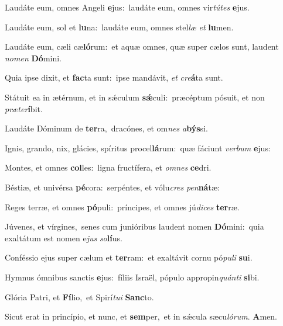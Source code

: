 Laudáte eum, omnes Angeli \textbf{e}jus:~\redgreheightstar laudáte eum, omnes vir\textit{tú}\textit{tes} \textbf{e}jus.

Laudáte eum, sol et \textbf{lu}na:~\redgreheightstar laudáte eum, omnes stel\textit{læ} \textit{et} \textbf{lu}men.

Laudáte eum, cæli cæ\textbf{ló}rum:~\redgreheightstar et aquæ omnes, quæ super cælos sunt, laudent \textit{no}\textit{men} \textbf{Dó}mini.

Quia ipse dixit, et \textbf{fac}ta sunt:~\redgreheightstar ipse mandávit, \textit{et} \textit{cre}\textbf{á}ta sunt.

Státuit ea in ætérnum, et in sǽculum \textbf{sǽ}culi:~\redgreheightstar præcéptum pósuit, et non \textit{præ}\textit{ter}\textbf{í}bit.

Laudáte Dóminum de \textbf{ter}ra,~\redgreheightstar dracónes, et om\textit{nes} \textit{a}\textbf{býs}si.

Ignis, grando, nix, glácies, spíritus procel\textbf{lá}rum:~\redgreheightstar quæ fáciunt \textit{ver}\textit{bum} \textbf{e}jus:

Montes, et omnes \textbf{col}les:~\redgreheightstar ligna fructífera, et \textit{om}\textit{nes} \textbf{ce}dri.

Béstiæ, et univérsa \textbf{pé}cora:~\redgreheightstar serpéntes, et vólu\textit{cres} \textit{pen}\textbf{ná}tæ:

Reges terræ, et omnes \textbf{pó}puli:~\redgreheightstar príncipes, et omnes jú\textit{di}\textit{ces} \textbf{ter}ræ.

Júvenes, et vírgines,~\reddagger senes cum junióribus laudent nomen \textbf{Dó}mini:~\redgreheightstar quia exaltátum est nomen e\textit{jus} \textit{so}\textbf{lí}us.

Conféssio ejus super cælum et \textbf{ter}ram:~\redgreheightstar et exaltávit cornu pó\textit{pu}\textit{li} \textbf{su}i.

Hymnus ómnibus sanctis \textbf{e}jus:~\redgreheightstar fíliis Israël, pópulo appropin\textit{quán}\textit{ti} \textbf{si}bi.

Glória Patri, et \textbf{Fí}lio,~\redgreheightstar et Spirí\textit{tu}\textit{i} \textbf{Sanc}to.

Sicut erat in princípio, et nunc, et \textbf{sem}per,~\redgreheightstar et in sǽcula sæcu\textit{ló}\textit{rum}. \textbf{A}men.

